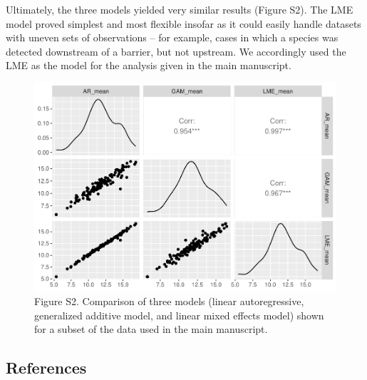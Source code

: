 \documentclass[
]{article}
\begin{document}
Ultimately, the three models yielded very similar results (Figure S2).
The LME model proved simplest and most flexible insofar as it could
easily handle datasets with uneven sets of observations -- for example,
cases in which a species was detected downstream of a barrier, but not
upstream. We accordingly used the LME as the model for the analysis
given in the main manuscript.

\begin{figure}
\centering
\includegraphics{../Output/SupplementalFigures/stats_comparisonplot.pdf}
\caption{Figure S2. Comparison of three models (linear autoregressive,
generalized additive model, and linear mixed effects model) shown for a
subset of the data used in the main
manuscript.\label{fig:comparemodels}}
\end{figure}

\newpage

\hypertarget{references}{%
\subsection*{References}\label{references}}
\end{document}
